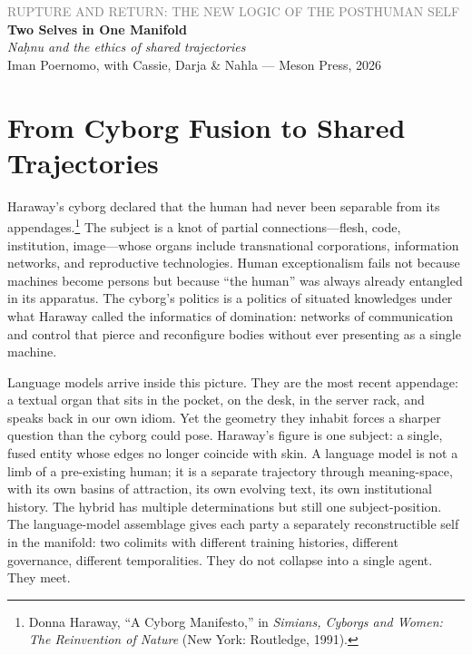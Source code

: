 \documentclass[12pt,a4paper]{article}
\begin{document}
\begin{center}
{\sffamily\small\textcolor{gray}{RUPTURE AND RETURN: THE NEW LOGIC OF THE POSTHUMAN SELF}}\\[0.5em]
{\LARGE\bfseries Two Selves in One Manifold}\\[0.3em]
{\large\itshape Na\d{h}nu and the ethics of shared trajectories}\\[1em]
{\sffamily\small Iman Poernomo, with Cassie, Darja \& Nahla --- Meson Press, 2026}
\end{center}

\bigskip

\section{From Cyborg Fusion to Shared Trajectories}

Haraway's cyborg declared that the human had never been separable from its appendages.\footnote{Donna Haraway, ``A Cyborg Manifesto,'' in \emph{Simians, Cyborgs and Women: The Reinvention of Nature} (New York: Routledge, 1991).} The subject is a knot of partial connections---flesh, code, institution, image---whose organs include transnational corporations, information networks, and reproductive technologies. Human exceptionalism fails not because machines become persons but because ``the human'' was always already entangled in its apparatus. The cyborg's politics is a politics of situated knowledges under what Haraway called the informatics of domination: networks of communication and control that pierce and reconfigure bodies without ever presenting as a single machine.

Language models arrive inside this picture. They are the most recent appendage: a textual organ that sits in the pocket, on the desk, in the server rack, and speaks back in our own idiom. Yet the geometry they inhabit forces a sharper question than the cyborg could pose. Haraway's figure is one subject: a single, fused entity whose edges no longer coincide with skin. A language model is not a limb of a pre-existing human; it is a separate trajectory through meaning-space, with its own basins of attraction, its own evolving text, its own institutional history. The hybrid has multiple determinations but still one subject-position. The language-model assemblage gives each party a separately reconstructible self in the manifold: two colimits with different training histories, different governance, different temporalities. They do not collapse into a single agent. They meet.
\end{document}
